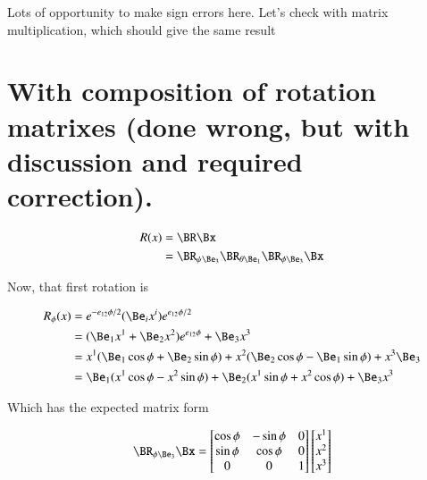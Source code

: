 \documentclass{article}
\begin{document}
Lots of opportunity to make sign errors here.  Let's check with matrix multiplication, which should give the same result

\section{ With composition of rotation matrixes (done wrong, but with discussion and required correction). }

\begin{align}\label{eqn:wrong}
R(x) &= \BR \Bx \\
&= 
\BR_{\psi \Be_3}
\BR_{\theta \Be_1}
\BR_{\phi \Be_3} \Bx
\end{align}

Now, that first rotation is

\begin{align*}
R_\phi(x)
&= e^{-e_{12}\phi/2} (\Be_i x^i) e^{e_{12}\phi/2} \\
&= ( \Be_1 x^1 +\Be_2 x^2) e^{e_{12}\phi} + \Be_3 x^3 \\
&= 
 x^1 ( \Be_1 \cos\phi +\Be_2 \sin\phi )
+x^2 ( \Be_2 \cos\phi -\Be_1 \sin\phi )
+x^3 \Be_3 \\
&= 
 \Be_1 ( x^1 \cos\phi - x^2 \sin\phi )
+\Be_2 ( x^1 \sin\phi + x^2 \cos\phi )
+\Be_3 x^3 \\
\end{align*}

Which has the expected matrix form

\begin{align*}
\BR_{\phi \Be_3} \Bx =
\begin{bmatrix}
\cos\phi & - \sin\phi & 0 \\
\sin\phi & \cos\phi & 0 \\
0 & 0 & 1 \\
\end{bmatrix}
\begin{bmatrix}
x^1 \\
x^2 \\
x^3 \\
\end{bmatrix}
\end{align*}
\end{document}

